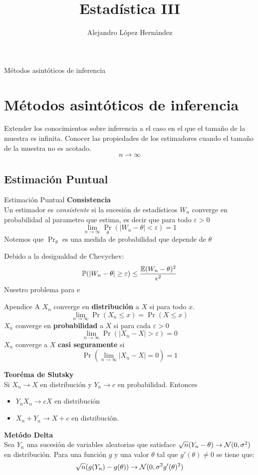 \documentclass{beamer}
\author[Alejandro López]{Alejandro López Hernández}
\institute[FES Acatlán UNAM ]
{ FES Acatlán\\
  Universidad Nacional Autónoma de México }
\title{Estadística III}
\begin{document}
\frame{\titlepage}
\frame{\tableofcontents}
\begin{frame}{Métodos asintóticos de inferencia}
\section{Métodos asintóticos de inferencia}
Extender los conocimientos sobre inferencia a el caso en el que el tamaño de la muestra es infinita. Conocer las propiedades de los estimadores cuando el tamaño de la muestra no es acotado.$$n\rightarrow \infty$$
\end{frame}
\subsection{Estimación Puntual}
\begin{frame}{Estimación Puntual}
\textbf{Consistencia}\\
Un estimador es \textit{consistente} si la sucesión de estadísticos $W_n$ converge en probabilidad al parametro que estima, es decir que para todo $\varepsilon>0$ $$\lim_{n\rightarrow \infty}\Pr_{\theta}(|W_n-\theta|<\varepsilon)=1$$
Notemos que $\Pr_{\theta}$ es una medida de probabilidad que depende de $\theta$ 
\end{frame}
\begin{frame}
Debido a la desigualdad de Chevychev: $${\mathbb P}(|W_n-\theta|\geq \varepsilon)\le \frac{\operatorname{\mathbb{E}}(W_n-\theta)^2}{\epsilon^2}$$
Nuestro problema para e 
\end{frame}
\appendix
\begin{frame}{Apendice A} 
$X_n$ converge en \textbf{distribución} a $X$ si para todo $x$. $$\lim_{n\rightarrow \infty}\Pr(X_n\le x)=\Pr(X\le x)$$ $X_n$ converge en \textbf{probabilidad} a $X$ si para cada $\varepsilon>0$ $$\lim_{n\rightarrow \infty}\Pr(|X_n-X|>\varepsilon) =0$$
$X_n$ converge a $X$ \textbf{casi seguramente} si $$\Pr(\lim_{n\rightarrow \infty}|X_n-X|=0)=1$$
\end{frame}
\begin{frame}
\textbf{Teoréma de Slutsky}\\
Si $X_n\rightarrow X$ en distribución y $Y_n\rightarrow c$ en probabilidad. Entonces 
\begin{itemize}
\item $Y_n X_n\rightarrow cX$ en distribución
\item $X_n+Y_n\rightarrow X+c$ en distribución.

\end{itemize}

\textbf{Metódo Delta}\\
Sea $Y_n$ una sucesión de variables aleatorias que satisface $\sqrt{n}(Y_n-\theta)\rightarrow {\mathcal N} (0,\sigma^2)$ en distribución. Para una función $g$ y una valor $\theta$ tal que $g'(\theta)\neq 0$ se tiene que: $$\sqrt{n}(g(Y_n)-g(\theta))\rightarrow {\mathcal N}(0,\sigma^2 g'(\theta)^2)$$
\end{frame}
\end{document}
